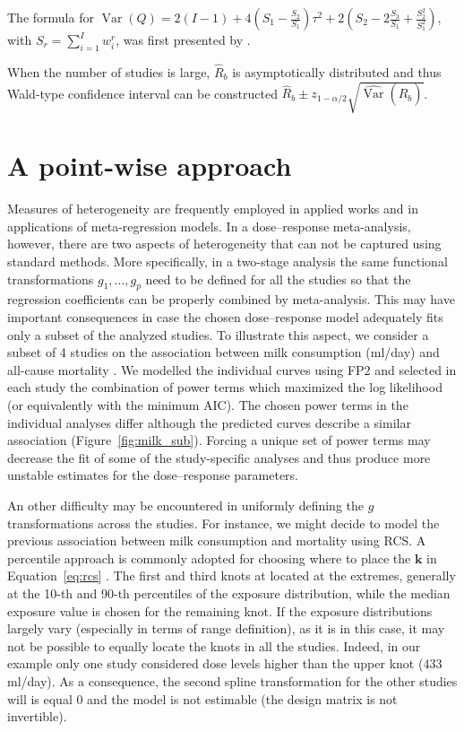 \documentclass[11pt,a4paper,twoside,openany]{book}\usepackage{knitr}
\DeclareMathOperator{\Var}{Var}
\begin{document}
{\noindent The formula for $\Var(Q) = 2(I-1) + 4\left(S_1 - \frac{S_2}{S_1}\right)\tau^2 + 2\left(S_2 - 2\frac{S_3}{S_1} + \frac{S_2^2}{S_1^2} \right)$, with $S_r = \sum_{i = 1}^I w_i^r$, was first presented by \cite{ biggerstaff1997incorporating}.

\noindent When the number of studies is large, $\hat R_b$ is asymptotically distributed and thus Wald-type confidence interval can be constructed $\hat R_b \pm z_{1-\alpha/2} \sqrt{ \widehat{\Var} \left(\hat R_b \right)}$.



\section{A point-wise approach}\label{sec:pwa}



Measures of heterogeneity are frequently employed in applied works and in applications of meta-regression models. In a dose--response meta-analysis, however, there are two aspects of heterogeneity that can not be captured using standard methods. More specifically, in a two-stage analysis the same functional transformations $g_1, \dots, g_p$ need to be defined for all the studies so that the regression coefficients can be properly combined by meta-analysis.
This may have important consequences in case the chosen dose--response model adequately fits only a subset of the analyzed studies. To illustrate this aspect, we consider a subset of 4 studies on the association between milk consumption (ml/day) and all-cause mortality \citep{larsson2015milk}. We modelled the individual curves using FP2 and selected in each study the combination of power terms which maximized the log likelihood (or equivalently with the minimum AIC). The chosen power terms in the individual analyses differ although the predicted curves describe a similar association (Figure~\ref{fig:milk_sub}). Forcing a unique set of power terms may decrease the fit of some of the study-specific analyses and thus produce more unstable estimates for the dose--response parameters.

\noindent An other difficulty may be encountered in uniformly defining the $g$ transformations across the studies. For instance, we might decide to model the previous association between milk consumption and mortality using RCS. A percentile approach is commonly adopted for choosing where to place the $\mathbf{k}$ in Equation~\ref{eq:rcs} \citep{harrell2013regression}. The first and third knots at located at the extremes, generally at the 10-th and 90-th percentiles of the exposure distribution, while the median exposure value is chosen for the remaining knot.
If the exposure distributions largely vary (especially in terms of range definition), as it is in this case, it may not be possible to equally locate the knots in all the studies. Indeed, in our example only one study considered dose levels higher than the upper knot (433 ml/day). As a consequence, the second spline transformation for the other studies will is equal 0 and the model is not estimable (the design matrix is not invertible). 

}
\end{document}
